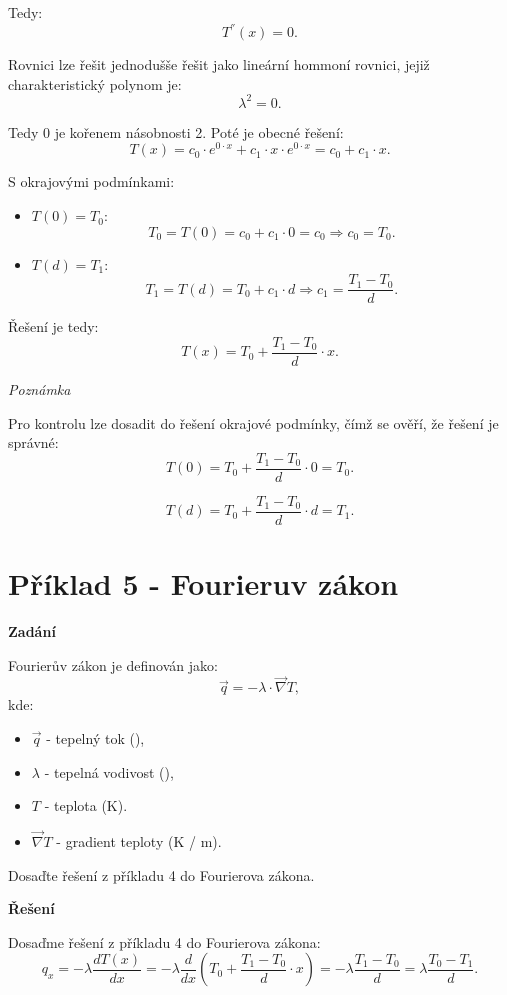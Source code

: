 \documentclass{article}
\begin{document}
Tedy:
$$
    T^{''}(x) = 0.
$$

Rovnici lze řešit jednodušše řešit jako lineární hommoní rovnici, jejiž charakteristický polynom je:
$$
    \lambda^2 = 0.
$$

Tedy 0 je kořenem násobnosti 2. Poté je obecné řešení:
$$
    T(x) = c_0 \cdot e^{0 \cdot x} + c_1 \cdot x \cdot e^{0 \cdot x} = c_0 + c_1 \cdot x.
$$

S okrajovými podmínkami:
\begin{itemize}
    \item $T(0) = T_0$:
          $$
              T_0 = T(0) = c_0 + c_1 \cdot 0 = c_0 \Rightarrow c_0 = T_0.
          $$
    \item $T(d) = T_1$:
          $$
              T_1 = T(d) = T_0 + c_1 \cdot d \Rightarrow c_1 = \frac{T_1 - T_0}{d}.
          $$
\end{itemize}

Řešení je tedy:
$$
    T(x) = T_0 + \frac{T_1 - T_0}{d} \cdot x.
$$

\textit{Poznámka}

Pro kontrolu lze dosadit do řešení okrajové podmínky, čímž se ověří, že řešení je správné:
$$
    T(0) = T_0 + \frac{T_1 - T_0}{d} \cdot 0 = T_0.
$$

$$
    T(d) = T_0 + \frac{T_1 - T_0}{d} \cdot d = T_1.
$$



\section*{Příklad 5 - Fourieruv zákon}

\textbf{Zadání}

Fourierův zákon je definován jako:
\begin{equation}
    \vec{q} = - \lambda \cdot \vec{\nabla} T,
\end{equation}
kde:
\begin{itemize}
    \item $\vec{q}$ - tepelný tok (\ueqWandMinvsq),
    \item $\lambda$ - tepelná vodivost (\ueqWandMinvsqKinv),
    \item $T$ - teplota (K).
    \item $\vec{\nabla} T$ - gradient teploty (K / m).
\end{itemize}

Dosaďte řešení z příkladu 4 do Fourierova zákona.

\textbf{Řešení}

Dosaďme řešení z příkladu 4 do Fourierova zákona:
$$
    q_x = - \lambda  \frac{dT(x)}{dx} = - \lambda  \frac{d}{dx} \left( T_0 + \frac{T_1 - T_0}{d} \cdot x \right) = - \lambda  \frac{T_1 - T_0}{d} = \lambda  \frac{T_0 - T_1}{d}.
$$
\end{document}
